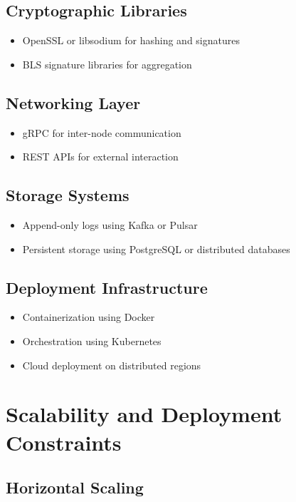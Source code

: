 \subsection{Cryptographic Libraries}

\begin{itemize}
\item OpenSSL or libsodium for hashing and signatures
\item BLS signature libraries for aggregation
\end{itemize}

\subsection{Networking Layer}

\begin{itemize}
\item gRPC for inter-node communication
\item REST APIs for external interaction
\end{itemize}

\subsection{Storage Systems}

\begin{itemize}
\item Append-only logs using Kafka or Pulsar
\item Persistent storage using PostgreSQL or distributed databases
\end{itemize}

\subsection{Deployment Infrastructure}

\begin{itemize}
\item Containerization using Docker
\item Orchestration using Kubernetes
\item Cloud deployment on distributed regions
\end{itemize}

\section{Scalability and Deployment Constraints}

\subsection{Horizontal Scaling}

